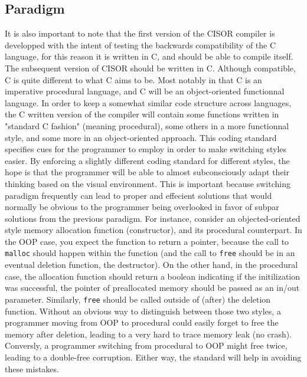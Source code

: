 \documentclass{article}
\newcommand{\csr}{C\raisebox{0.15em}{\textasteriskcentered}}
\begin{document}
\subsection{Paradigm}
It is also important to note that the first version of the CISOR compiler is developped with the intent of testing the backwards compatibility of the \csr{} language, for this reason it is written in C, and should be able to compile itself. The subsequent version of CISOR should be written in \csr{}. Although compatible, C is quite different to what \csr{} aims to be. Most notably in that C is an imperative procedural language, and \csr{} will be an object-oriented functionnal language. In order to keep a somewhat similar code structure across languages, the C written version of the compiler will contain some functions written in "standard C fashion" (meaning procedural), some others in a more functionnal style, and some more in an object-oriented approach. This coding standard specifies cues for the programmer to employ in order to make switching styles easier. By enforcing a slightly different coding standard for different styles, the hope is that the programmer will be able to almost subconsciously adapt their thinking based on the visual environment. This is important because switching paradigm frequently can lead to proper and effecient solutions that would normally be obvious to the programmer being overlooked in favor of subpar solutions from the previous paradigm. For instance, consider an objected-oriented style memory allocation function (constructor), and its procedural counterpart. In the OOP case, you expect the function to return a pointer, because the call to \texttt{malloc} should happen within the function (and the call to \texttt{free} should be in an eventual deletion function, the destructor). On the other hand, in the procedural case, the allocation function should return a boolean indicating if the initilization was successful, the pointer of preallocated memory should be passed as an in/out parameter. Similarly, \texttt{free} should be called outside of (after) the deletion function. Without an obvious way to distinguish between those two styles, a programmer moving from OOP to procedural could easily forget to free the memory after deletion, leading to a very hard to trace memory leak (no crash). Conversly, a programmer switching from procedural to OOP might free twice, leading to a double-free corruption. Either way, the standard will help in avoiding these mistakes.

\pagebreak
\end{document}
